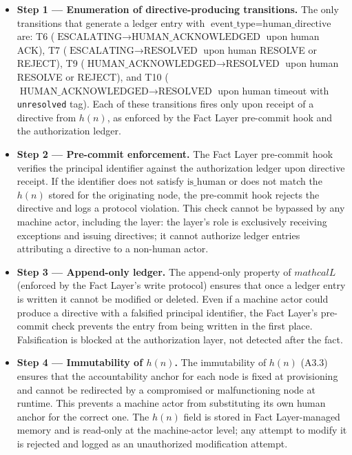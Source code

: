 \begin{itemize}
\item \textbf{Step 1 — Enumeration of directive-producing transitions.} The only transitions that generate a ledger entry with $\text{event\_type} = \text{human\_directive}$ are: T6 ($\text{ESCALATING} \rightarrow \text{HUMAN\_ACKNOWLEDGED}$ upon human ACK), T7 ($\text{ESCALATING} \rightarrow \text{RESOLVED}$ upon human RESOLVE or REJECT), T9 ($\text{HUMAN\_ACKNOWLEDGED} \rightarrow \text{RESOLVED}$ upon human RESOLVE or REJECT), and T10 ($\text{HUMAN\_ACKNOWLEDGED} \rightarrow \text{RESOLVED}$ upon human timeout with \texttt{unresolved} tag). Each of these transitions fires only upon receipt of a directive from $h(n)$, as enforced by the Fact Layer pre-commit hook and the authorization ledger.

\item \textbf{Step 2 — Pre-commit enforcement.} The Fact Layer pre-commit hook verifies the principal identifier against the authorization ledger upon directive receipt. If the identifier does not satisfy $\text{is\_human}$ or does not match the $h(n)$ stored for the originating node, the pre-commit hook rejects the directive and logs a protocol violation. This check cannot be bypassed by any machine actor, including the \purpose{} layer: the \purpose{} layer's role is exclusively receiving exceptions and issuing directives; it cannot authorize ledger entries attributing a directive to a non-human actor.

\item \textbf{Step 3 — Append-only ledger.} The append-only property of $mathcal{L}$ (enforced by the Fact Layer's write protocol) ensures that once a ledger entry is written it cannot be modified or deleted. Even if a machine actor could produce a directive with a falsified principal identifier, the Fact Layer's pre-commit check prevents the entry from being written in the first place. Falsification is blocked at the authorization layer, not detected after the fact.

\item \textbf{Step 4 — Immutability of $h(n)$.} The immutability of $h(n)$ (A3.3) ensures that the accountability anchor for each node is fixed at provisioning and cannot be redirected by a compromised or malfunctioning node at runtime. This prevents a machine actor from substituting its own human anchor for the correct one. The $h(n)$ field is stored in Fact Layer-managed memory and is read-only at the machine-actor level; any attempt to modify it is rejected and logged as an unauthorized modification attempt.
\end{itemize}

